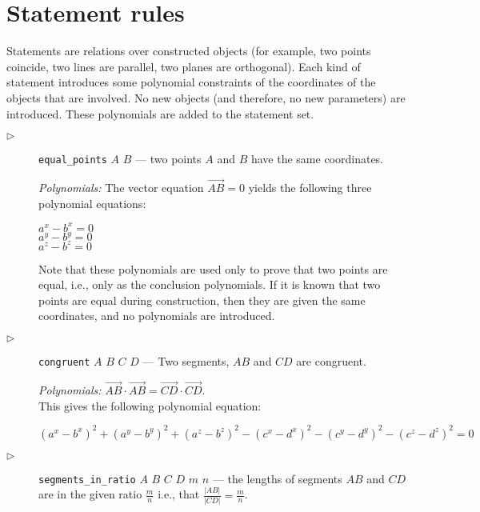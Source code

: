 \documentclass{article}
\begin{document}
\section{Statement rules}
Statements are relations over constructed objects (for example, two
points coincide, two lines are parallel, two planes are orthogonal).
Each kind of statement introduces some polynomial constraints of the
coordinates of the objects that are involved. No new objects (and
therefore, no new parameters) are introduced. These polynomials are
added to the statement set.

\begin{description}
\item[$\triangleright$] {\tt equal\_points} $A$ $B$ --- two points $A$
  and $B$ have the same coordinates.

  {\em Polynomials:} The vector equation $\overrightarrow{AB} = 0$
  yields the following three polynomial equations:
  \begin{tabbing}
    $a^x - b^x = 0$\\
    $a^y - b^y = 0$\\
    $a^z - b^z = 0$
  \end{tabbing}

  Note that these polynomials are used only to prove that two points
  are equal, i.e., only as the conclusion polynomials. If it is known
  that two points are equal during construction, then they are given
  the same coordinates, and no polynomials are introduced.

\item[$\triangleright$] {\tt congruent} $A$ $B$ $C$ $D$ --- Two
  segments, $AB$ and $CD$ are congruent.


{\em Polynomials:}
$\overrightarrow{AB} \cdot \overrightarrow{AB} = \overrightarrow{CD} \cdot \overrightarrow{CD}$. \\
This gives the following polynomial equation:

$$({a^x} - {b^x})^2 + ({a^y} - {b^y})^2 + ({a^z} - {b^z})^2 - ({c^x} - {d^x})^2 - ({c^y} - {d^y})^2 - ({c^z} - {d^z})^2 = 0$$

\item[$\triangleright$] {\tt segments\_in\_ratio} $A$ $B$ $C$ $D$
  $m$ $n$ --- the lengths of segments $AB$ and
  $CD$ are in the given ratio $\frac{m}{n}$ i.e., that
  $\frac{|AB|}{|CD|} = \frac{m}{n}$.


\end{description}
\end{document}
